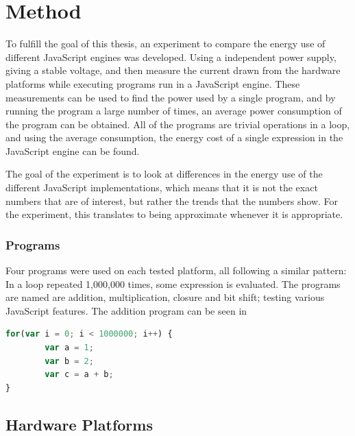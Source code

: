 \chapter{Method}
\label{ch:chapter2}


To fulfill the goal of this thesis, an experiment to compare the energy use of different JavaScript engines was developed. Using a independent power supply, giving a stable voltage, and then measure the current drawn from the hardware platforms while executing programs run in a JavaScript engine.
These measurements can be used to find the power used by a single program, and by running the program a large number of times, an average power consumption of the program can be obtained.
All of the programs are trivial operations in a loop, and using the average consumption, the energy cost of a single expression in the JavaScript engine can be found.

The goal of the experiment is to look at differences in the energy use of the different JavaScript implementations, which means that it is not the exact numbers that are of interest, but rather the trends that the numbers show.
For the experiment, this translates to being approximate whenever it is appropriate.


\subsection{Programs}
Four programs were used on each tested platform, all following a similar pattern: In a loop repeated 1,000,000 times, some expression is evaluated.
The programs are named  are addition, multiplication, closure and bit shift; testing various JavaScript features.
The addition program can be seen in 


\begin{lstlisting}[language=JavaScript,caption={Addition program}, label={lst:add}]
for(var i = 0; i < 1000000; i++) {
        var a = 1;
        var b = 2;
        var c = a + b;
}
\end{lstlisting}




\section{Hardware Platforms}


